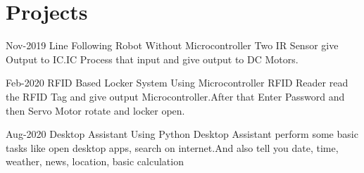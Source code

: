 \documentclass[]{cv-style}          %
\begin{document}
\section{Projects}

\begin{entrylist}
\entry
{Nov-2019}
{Line Following Robot Without Microcontroller}
{\newline\textbullet Two IR Sensor give Output to IC.\newline\textbullet IC Process that input and give output to DC Motors.}
{\vspace{-0.3cm}}
\end{entrylist}


\begin{entrylist}
\entry
{Feb-2020}
{RFID Based Locker System Using Microcontroller}
{\newline\textbullet RFID Reader read the RFID Tag and give output Microcontroller.\newline\textbullet After that Enter Password and then Servo Motor rotate and locker open.}
{\vspace{-0.3cm}}
\end{entrylist}


\begin{entrylist}
\entry
{Aug-2020}
{Desktop Assistant Using Python}
{\newline\textbullet Desktop Assistant perform some basic tasks like open desktop apps, search on internet.\newline\textbullet And also tell you date, time, weather, news, location, basic calculation}
{\vspace{-0.3cm}}
\end{entrylist}




\end{document}
